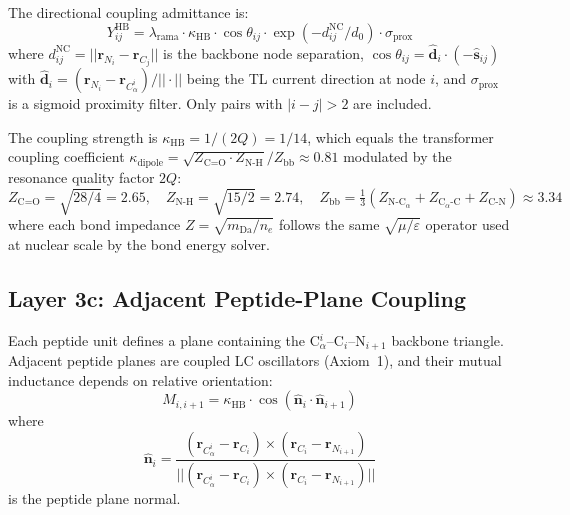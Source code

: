 The directional coupling admittance is:
\begin{equation}
    Y_{ij}^\text{HB} = \lambda_\text{rama} \cdot \kappa_\text{HB} \cdot \cos\theta_{ij} \cdot \exp(-d_{ij}^\text{NC}/d_0) \cdot \sigma_\text{prox}
    \label{eq:hbond_coupling}
\end{equation}
where $d_{ij}^\text{NC} = ||\mathbf{r}_{N_i} - \mathbf{r}_{C_j}||$ is the backbone node separation, $\cos\theta_{ij} = \hat{\mathbf{d}}_i \cdot (-\hat{\mathbf{s}}_{ij})$ with $\hat{\mathbf{d}}_i = (\mathbf{r}_{N_i} - \mathbf{r}_{C_\alpha^i})/||\cdot||$ being the TL current direction at node $i$, and $\sigma_\text{prox}$ is a sigmoid proximity filter.  Only pairs with $|i-j| > 2$ are included.

The coupling strength is $\kappa_\text{HB} = 1/(2Q) = 1/14$, which equals the transformer coupling coefficient $\kappa_\text{dipole} = \sqrt{Z_\text{C=O} \cdot Z_\text{N-H}}/Z_\text{bb} \approx 0.81$ modulated by the resonance quality factor $2Q$:
\begin{equation}
    Z_\text{C=O} = \sqrt{28/4} = 2.65, \quad Z_\text{N-H} = \sqrt{15/2} = 2.74, \quad Z_\text{bb} = \tfrac{1}{3}(Z_{\text{N-C}_\alpha} + Z_{\text{C}_\alpha\text{-C}} + Z_\text{C-N}) \approx 3.34
    \label{eq:bond_impedances}
\end{equation}
where each bond impedance $Z = \sqrt{m_\text{Da}/n_e}$ follows the same $\sqrt{\mu/\varepsilon}$ operator used at nuclear scale by the bond energy solver.

\subsection{Layer 3c: Adjacent Peptide-Plane Coupling}
\label{sec:peptide_plane_coupling}

Each peptide unit defines a plane containing the C$_\alpha^i$--C$_i$--N$_{i+1}$ backbone triangle.  Adjacent peptide planes are coupled LC oscillators (Axiom~1), and their mutual inductance depends on relative orientation:
\begin{equation}
    M_{i,i+1} = \kappa_\text{HB} \cdot \cos(\hat{\mathbf{n}}_i \cdot \hat{\mathbf{n}}_{i+1})
    \label{eq:plane_coupling}
\end{equation}
where
\begin{equation}
    \hat{\mathbf{n}}_i = \frac{(\mathbf{r}_{C_\alpha^i} - \mathbf{r}_{C_i}) \times (\mathbf{r}_{C_i} - \mathbf{r}_{N_{i+1}})}{||(\mathbf{r}_{C_\alpha^i} - \mathbf{r}_{C_i}) \times (\mathbf{r}_{C_i} - \mathbf{r}_{N_{i+1}})||}
    \label{eq:plane_normal}
\end{equation}
is the peptide plane normal.

